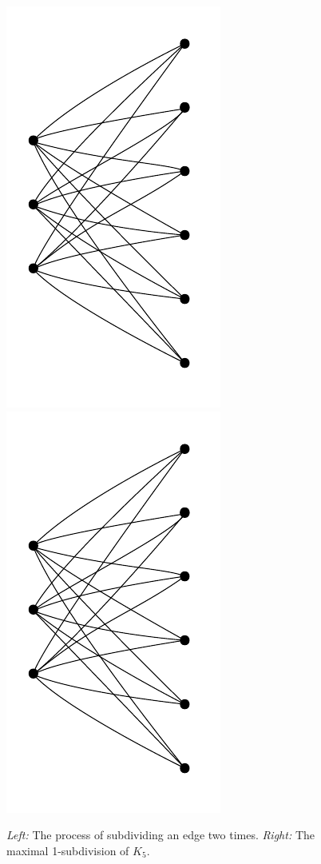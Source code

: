 \begin{figure}[h]
  \centering
    \includegraphics[scale=0.35,page=3]{pictures.pdf}\hspace{2cm}    \includegraphics[scale=0.35,page=4]{pictures.pdf}
  \caption{\emph{Left:} The process of subdividing an edge two times.
  \emph{Right:} The maximal 1-subdivision of $K_5$.
  } 
  \label{fig:subdivision}
\end{figure}


